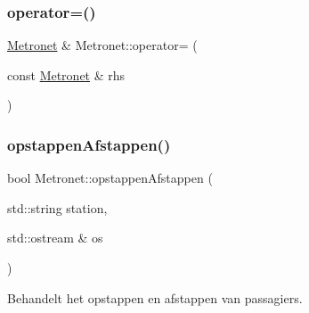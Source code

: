 \subsubsection{\texorpdfstring{operator=()}{operator=()}}
{\footnotesize\ttfamily \hyperlink{class_metronet}{Metronet} \& Metronet\+::operator= (\begin{DoxyParamCaption}\item[{const \hyperlink{class_metronet}{Metronet} \&}]{rhs }\end{DoxyParamCaption})}

\mbox{\label{class_metronet_a78c0cd9912306a5f7438ea43f5088e0a}} 
\subsubsection{\texorpdfstring{opstappen\+Afstappen()}{opstappenAfstappen()}}
{\footnotesize\ttfamily bool Metronet\+::opstappen\+Afstappen (\begin{DoxyParamCaption}\item[{std\+::string}]{station,  }\item[{std\+::ostream \&}]{os }\end{DoxyParamCaption})}



Behandelt het opstappen en afstappen van passagiers. 


